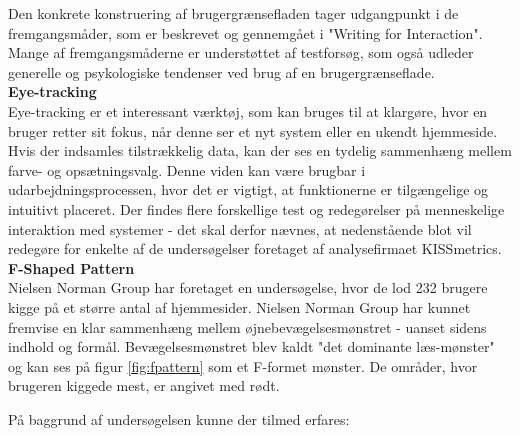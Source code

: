 Den konkrete konstruering af brugergrænsefladen tager udgangpunkt i de fremgangsmåder, som er beskrevet og gennemgået i "Writing for Interaction"\cite{DesignUI}. Mange af fremgangsmåderne er understøttet af testforsøg, som også udleder generelle og psykologiske tendenser ved brug af en brugergrænseflade.\\

\textbf{Eye-tracking}\\
Eye-tracking er et interessant værktøj, som kan bruges til at klargøre, hvor en bruger retter sit fokus, når denne ser et nyt system eller en ukendt hjemmeside. Hvis der indsamles tilstrækkelig data, kan der ses en tydelig sammenhæng mellem farve- og opsætningsvalg. Denne viden kan være brugbar i udarbejdningsprocessen, hvor det er vigtigt, at funktionerne er tilgængelige og intuitivt placeret. 
Der findes flere forskellige test og redegørelser på menneskelige interaktion med systemer - det skal derfor nævnes, at nedenstående blot vil redegøre for enkelte af de undersøgelser foretaget af analysefirmaet KISSmetrics\cite{eye_tracking_studios}.\\

\textbf{F-Shaped Pattern}\\
Nielsen Norman Group har foretaget en undersøgelse, hvor de lod 232 brugere kigge på et større antal af hjemmesider. Nielsen Norman Group har kunnet fremvise en klar sammenhæng mellem øjnebevægelsesmønstret - uanset sidens indhold og formål. Bevægelsesmønstret blev kaldt "det dominante læs-mønster"\mbox{} og kan ses på figur \ref{fig:fpattern} som et F-formet mønster. De områder, hvor brugeren kiggede mest, er angivet med rødt. \cite{eye_tracking_studios}


På baggrund af undersøgelsen kunne der tilmed erfares:

